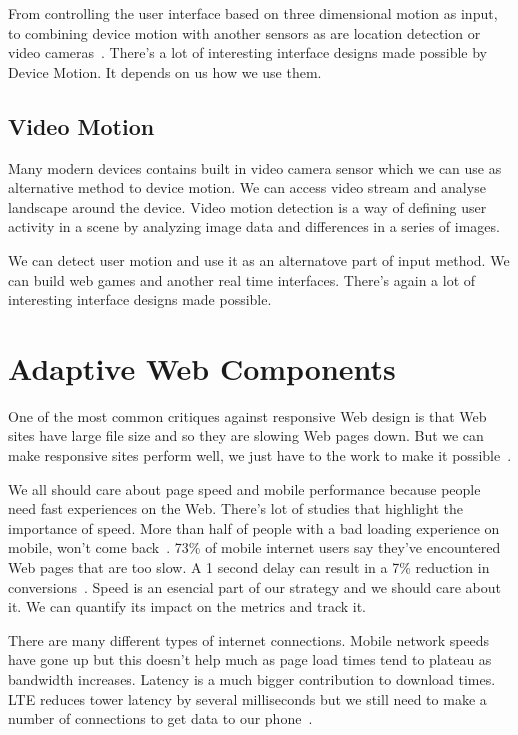 \documentclass{iitsrc}
\begin{document}
From controlling the user interface based on three dimensional motion as input, to combining device motion with another sensors as are location detection or video cameras~\cite{AccelerationAndGyroscope}. There's a lot of interesting interface designs made possible by Device Motion. It depends on us how we use them.


\subsection{Video Motion} %
\label{sub:video_motion}

Many modern devices contains built in video camera sensor which we can use as alternative method to device motion. We can access video stream and analyse landscape around the device. Video motion detection is a way of defining user activity in a scene by analyzing image data and differences in a series of images.

We can detect user motion and use it as an alternatove part of input method. We can build web games and another real time interfaces. There's again a lot of interesting interface designs made possible.


\section{Adaptive Web Components} %
\label{sec:adaptive_web_components}

One of the most common critiques against responsive Web design is that Web sites have large file size and so they are slowing Web pages down. But we can make responsive sites perform well, we just have to the work to make it possible~\cite{20mb}.

We all should care about page speed and mobile performance because people need fast experiences on the Web. There's lot of studies that highlight the importance of speed. More than half of people with a bad loading experience on mobile, won't come back~\cite{performancebrowsernetworking}. 73\% of mobile internet users say they've encountered Web pages that are too slow. A 1 second delay can result in a 7\% reduction in conversions~\cite{pagespeed}. Speed is an esencial part of our strategy and we should care about it. We can quantify its impact on the metrics and track it.

There are many different types of internet connections. Mobile network speeds have gone up but this doesn't help much as page load times tend to plateau as bandwidth increases. Latency is a much bigger contribution to download times. LTE reduces tower latency by several milliseconds but we still need to make a number of connections to get data to our phone~\cite{performancebrowsernetworking}.
\end{document}
